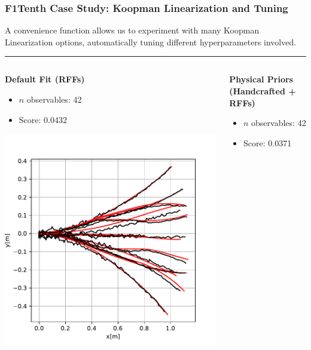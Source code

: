 \documentclass[shortpres,aspectratio=43]{beamer}
\begin{document}
\begin{frame}
\frametitle{F1Tenth Case Study: Koopman Linearization and Tuning}
A convenience function allows us to experiment with many Koopman Linearization options, automatically tuning different hyperparameters involved. 
\rule{\textwidth}{1pt}
\vspace{-0.25cm}
\begin{columns}
	\begin{column}{0.32\linewidth}
		\small
		\textbf{Default Fit (RFFs)}
		\begin{itemize}
			\item $n$ observables: 42
			\item Score: 0.0432
		\end{itemize}
		\begin{center}
		\includegraphics[width=0.8\linewidth]{./img/predictions.pdf}
		\end{center}
	\end{column}
	\begin{column}{0.32\linewidth}
		\small
		\textbf{Physical Priors (Handcrafted + RFFs)}
		\begin{itemize}
			\item $n$ observables: 42
			\item Score: 0.0371
		\end{itemize}
		\begin{center}

\end{center}
\end{column}
\end{columns}
\end{frame}
\end{document}
